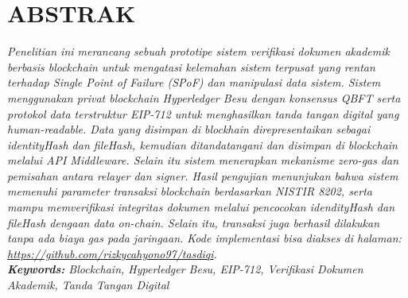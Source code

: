 \chapter*{ABSTRAK}

\textit{Penelitian ini merancang sebuah prototipe sistem verifikasi dokumen akademik berbasis
blockchain untuk mengatasi kelemahan sistem terpusat yang rentan terhadap Single
Point of Failure (SPoF) dan manipulasi data sistem. Sistem menggunakan privat
blockchain Hyperledger Besu dengan konsensus QBFT serta protokol data terstruktur
EIP-712 untuk menghasilkan tanda tangan digital yang human-readable. Data yang
disimpan di blockhain direpresentaikan sebagai identityHash dan fileHash, kemudian
ditandatangani dan disimpan di blockchain melalui API Middleware. Selain itu sistem
menerapkan mekanisme zero-gas dan pemisahan antara relayer dan signer. Hasil
pengujian menunjukan bahwa sistem memenuhi parameter transaksi blockchain
berdasarkan NISTIR 8202, serta mampu memverifikasi integritas dokumen melalui
pencocokan idendityHash dan fileHash dengaan data on-chain. Selain itu, transaksi juga
berhasil dilakukan tanpa ada biaya gas pada jaringaan. Kode implementasi bisa diakses
di halaman: \url{https://github.com/rizkycahyono97/tasdiqi}.}\\	

\noindent\textit{\textbf{Keywords:} Blockchain, Hyperledger Besu, EIP-712, Verifikasi Dokumen Akademik, Tanda Tangan Digital}\\	%



